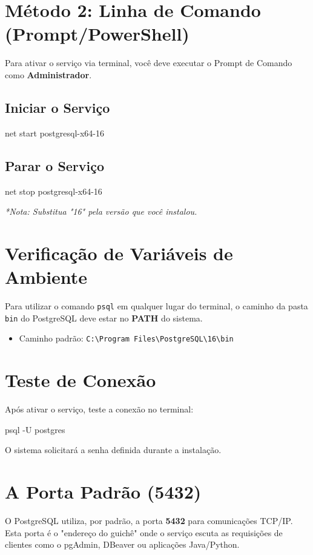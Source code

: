 \documentclass[12pt,a4paper,openright]{book}
\begin{document}
\section{Método 2: Linha de Comando (Prompt/PowerShell)}
Para ativar o serviço via terminal, você deve executar o Prompt de Comando como \textbf{Administrador}.

\subsection{Iniciar o Serviço}
\begin{sqlcode}
net start postgresql-x64-16
\end{sqlcode}

\subsection{Parar o Serviço}
\begin{sqlcode}
net stop postgresql-x64-16
\end{sqlcode}
\textit{*Nota: Substitua "16" pela versão que você instalou.}

\section{Verificação de Variáveis de Ambiente}
Para utilizar o comando \texttt{psql} em qualquer lugar do terminal, o caminho da pasta \texttt{bin} do PostgreSQL deve estar no \textbf{PATH} do sistema.

\begin{itemize}
    \item Caminho padrão: \texttt{C:\textbackslash Program Files\textbackslash PostgreSQL\textbackslash 16\textbackslash bin}
\end{itemize}

\section{Teste de Conexão}
Após ativar o serviço, teste a conexão no terminal:
\begin{sqlcode}
psql -U postgres
\end{sqlcode}
O sistema solicitará a senha definida durante a instalação.

\section{A Porta Padrão (5432)}
O PostgreSQL utiliza, por padrão, a porta \textbf{5432} para comunicações TCP/IP. 
Esta porta é o "endereço do guichê" onde o serviço escuta as requisições de clientes como o pgAdmin, DBeaver ou aplicações Java/Python.
\end{document}
